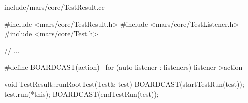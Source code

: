 \begin{content}
\begin{nodiff}{include/mars/core/TestResult.cc}
 \begin{c++}
#include <mars/core/TestResult.h>
#include <mars/core/TestListener.h>
#include <mars/core/Test.h>

// ...

#define BOARDCAST(action) \
  for (auto listener : listeners) listener->action

void TestResult::runRootTest(Test& test) {
  BOARDCAST(startTestRun(test));
  test.run(*this);
  BOARDCAST(endTestRun(test));
}
 \end{c++}
\end{nodiff}

\end{content}
